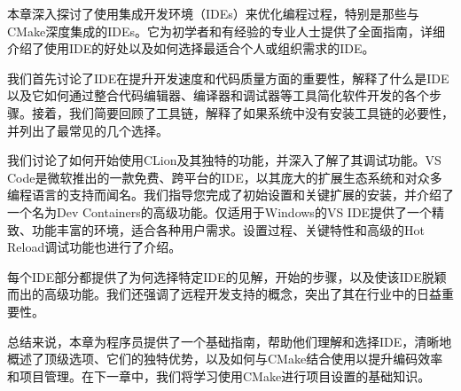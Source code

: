
本章深入探讨了使用集成开发环境（IDEs）来优化编程过程，特别是那些与CMake深度集成的IDEs。它为初学者和有经验的专业人士提供了全面指南，详细介绍了使用IDE的好处以及如何选择最适合个人或组织需求的IDE。

我们首先讨论了IDE在提升开发速度和代码质量方面的重要性，解释了什么是IDE以及它如何通过整合代码编辑器、编译器和调试器等工具简化软件开发的各个步骤。接着，我们简要回顾了工具链，解释了如果系统中没有安装工具链的必要性，并列出了最常见的几个选择。

我们讨论了如何开始使用CLion及其独特的功能，并深入了解了其调试功能。VS Code是微软推出的一款免费、跨平台的IDE，以其庞大的扩展生态系统和对众多编程语言的支持而闻名。我们指导您完成了初始设置和关键扩展的安装，并介绍了一个名为Dev Containers的高级功能。仅适用于Windows的VS IDE提供了一个精致、功能丰富的环境，适合各种用户需求。设置过程、关键特性和高级的Hot Reload调试功能也进行了介绍。

每个IDE部分都提供了为何选择特定IDE的见解，开始的步骤，以及使该IDE脱颖而出的高级功能。我们还强调了远程开发支持的概念，突出了其在行业中的日益重要性。

总结来说，本章为程序员提供了一个基础指南，帮助他们理解和选择IDE，清晰地概述了顶级选项、它们的独特优势，以及如何与CMake结合使用以提升编码效率和项目管理。在下一章中，我们将学习使用CMake进行项目设置的基础知识。